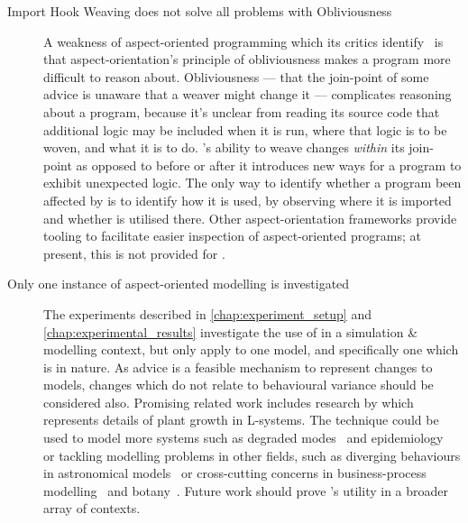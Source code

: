 \begin{description}

  \item[Import Hook Weaving does not solve all problems with Obliviousness]
    A weakness of aspect-oriented programming which its critics
    identify~\cite{steimann06paradoxical,Constantinides04aopconsidered,przybylek2010wrong}
    is that aspect-orientation's principle of obliviousness makes a program more
    difficult to reason about. Obliviousness --- that the join-point of some
    advice is unaware that a weaver might change it --- complicates reasoning
    about a program, because it's unclear from reading its source code that
    additional logic may be included when it is run, where that logic is to be
    woven, and what it is to do. \pdsf{}'s ability to weave changes
    \emph{within} its join-point as opposed to before or after it introduces new
    ways for a program to exhibit unexpected logic. The only way to identify
    whether a program been affected by \pdsf{} is to identify how it is used, by
    observing where it is imported and whether \pdsf{} is utilised there. Other
    aspect-orientation frameworks provide tooling to facilitate easier
    inspection of aspect-oriented programs; at present, this is not provided for
    \pdsf{}.

  \item[Only one instance of aspect-oriented modelling is investigated]
    The experiments described in \cref{chap:experiment_setup} and
    \cref{chap:experimental_results} investigate the use of \aop{} in a
    simulation \& modelling context, but only apply \aspectorientation{} to one
    model, and specifically one which is \sociotechnical{} in nature. As advice
    is a feasible mechanism to represent changes to models, changes which do not
    relate to behavioural variance should be considered also. Promising related
    work includes research by \citet{Cieslak_2011} which represents details of
    plant growth in \aspectoriented{} L-systems. The technique could be used to
    model more \sociotechnical{} systems such as degraded
    modes~\cite{johnson2007degradedmodes} and
    epidemiology~\cite{aranTheatreThesis} or tackling modelling problems in
    other fields, such as diverging behaviours in astronomical
    models~\cite{comparison_of_galaxy_formation_models,comparison_of_radiative_models_of_galaxies}
    or cross-cutting concerns in business-process
    modelling~\cite{Cappelli_AOBPM,da2020implementation} and
    botany~\cite{Cieslak_2011}. Future work should prove \aop{}'s utility in
    a broader array of contexts.


\end{description}
